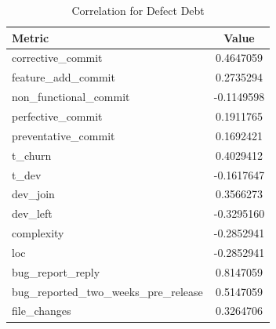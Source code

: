 \begin{table}[!hbt]
      \begin{center}
            \caption{Correlation for Defect Debt}
            \label{tab:correlation_defect_debt}
            \begin{tabular}{l| c}
            \toprule
            \textbf{Metric}                            & \textbf{Value}         \\ \midrule                                         
                corrective\_commit                      &              0.4647059 \\ 
                feature\_add\_commit                     &              0.2735294 \\ 
                non\_functional\_commit                  &             -0.1149598 \\ 
                perfective\_commit                      &              0.1911765 \\ 
                preventative\_commit                    &              0.1692421 \\ 
                t\_churn                                &              0.4029412 \\ 
                t\_dev                                  &             -0.1617647 \\ 
                dev\_join                               &              0.3566273 \\ 
                dev\_left                               &             -0.3295160 \\ 
                complexity                             &             -0.2852941 \\ 
                loc                                    &             -0.2852941 \\ 
                bug\_report\_reply                       &              0.8147059 \\ 
                bug\_reported\_two\_weeks\_pre\_release     &              0.5147059 \\ 
                file\_changes                           &              0.3264706 \\  \bottomrule
            \end{tabular}
      \end{center}
\end{table}

